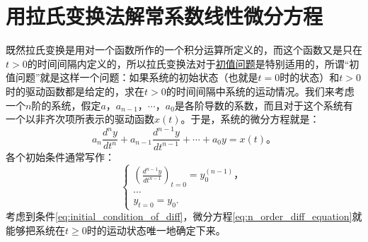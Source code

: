 \section{用拉氏变换法解常系数线性微分方程}

既然拉氏变换是用对一个函数所作的一个积分运算所定义的，而这个函数又是只在$t>0$的时间间隔内定义的，所以拉氏变换法对于\underline{初值问题}是特别适用的，所谓“初值问题”就是这样一个问题：如果系统的初始状态（也就是$t=0$时的状态）和$t>0$时的驱动函数都是给定的，求在$t>0$的时间间隔中系统的运动情况。我们来考虑一个$n$阶的系统，假定$a，a_{n-1}，\cdots，a_0$是各阶导数的系数，而且对于这个系统有一个以非齐次项所表示的驱动函数$x(t)$。于是，系统的微分方程就是：
\begin{equation}\label{eq:n_order_diff_equation}
a_n\frac{d^ny}{dt^n} + a_{n-1}\frac{d^{n-1}y}{dt^{n-1}} + \cdots + a_0y=x(t)。
\end{equation}
各个初始条件通常写作：
\begin{equation}\label{eq:initial_condition_of_diff}
\begin{cases}
\left( \frac{d^{n-1}y}{dt^{n-1}} \right)_{t=0} = y_0^{(n-1)}， \\
\cdots \\
y_{t=0} = y_0.
\end{cases}
\end{equation}
考虑到条件\eqref{eq:initial_condition_of_diff}，微分方程\eqref{eq:n_order_diff_equation}就能够把系统在$t\geq 0$时的运动状态唯一地确定下来。

